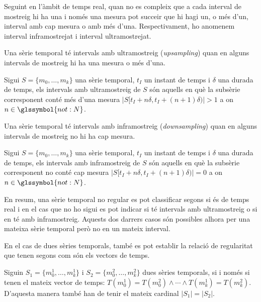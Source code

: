 Seguint en l'àmbit de temps real, quan no es compleix que a cada
interval de mostreig hi ha una i només una mesura pot succeir que hi
hagi un, o més d'un, interval amb cap mesura o amb més
d'una. Respectivament, ho anomenem interval inframostrejat i interval
ultramostrejat. 



Una sèrie temporal té intervals amb ultramostreig (\emph{upsampling})
quan en alguns intervals de mostreig hi ha una mesura o més d'una.
\begin{definition}
  Sigui $S=\{m_0,\dotsc,m_k\}$ una sèrie temporal, $t_I$ un instant de
  temps i $\delta$ una durada de temps, els intervals amb
  ultramostreig de $S$ són aquells en què la
  subsèrie corresponent conté més d'una mesura
  $|S[t_I+n\delta,t_I+(n+1)\delta)|>1$ a on $n\in\glssymbol{not:N}$.
\end{definition}

Una sèrie temporal té intervals amb inframostreig
(\emph{downsampling}) quan en alguns intervals de mostreig no hi ha
cap mesura.
\begin{definition}
  Sigui $S=\{m_0,\dotsc,m_k\}$ una sèrie temporal, $t_I$ un instant de
  temps i $\delta$ una durada de temps, els intervals amb
  inframostreig de $S$ són aquells en què la
  subsèrie corresponent no conté cap mesura
  $|S[t_I+n\delta,t_I+(n+1)\delta)|=0$ a on $n\in\glssymbol{not:N}$.
\end{definition}



En resum, una sèrie temporal no regular es pot classificar segons
si és de temps real i en el cas que no ho sigui es pot indicar si té
intervals amb ultramostreig o si en té amb inframostreig. Aquests dos
darrers casos són possibles alhora per una mateixa sèrie temporal però
no en un mateix interval.




En el cas de dues sèries temporals, també es pot establir la relació
de regularitat que tenen segons com són els vectors de temps.
\begin{definition}
  \label{def:sgst:regulars_entre_elles}
  Siguin $S_1=\{m_0^1, \dotsc, m_k^1\}$ i $S_2=\{m_0^2, \dotsc,
  m_k^2\}$ dues sèries temporals,
   si i només si tenen el mateix vector de
  temps: $T(m_0^1)=T(m_0^2) \wedge \dotsb \wedge
  T(m_k^1)=T(m_k^2)$. D'aquesta manera també han de tenir el mateix
  cardinal $|S_1|=|S_2|$.
\end{definition}




